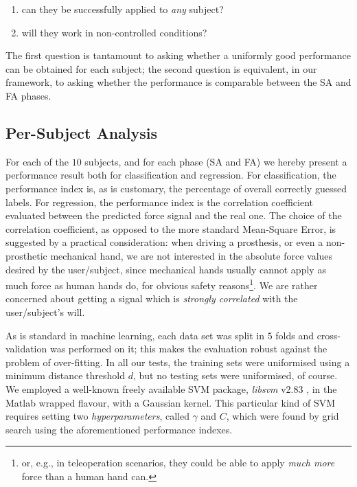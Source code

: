 \documentclass[10pt]{bmc_article}
\newenvironment{bmcformat}{\begin{raggedright}\baselineskip20pt\sloppy\setboolean{publ}{false}}{\end{raggedright}\baselineskip20pt\sloppy}
\begin{document}
\begin{bmcformat}
\begin{enumerate}

  \item can they be successfully applied to \emph{any} subject?

  \item will they work in non-controlled conditions?

\end{enumerate}

The first question is tantamount to asking whether a uniformly good
performance can be obtained for each subject; the second question is
equivalent, in our framework, to asking whether the performance is
comparable between the SA and FA phases.

\subsection*{Per-Subject Analysis}

For each of the $10$ subjects, and for each phase (SA and FA) we
hereby present a performance result both for classification and
regression. For classification, the performance index is, as is
customary, the percentage of overall correctly guessed labels. For
regression, the performance index is the correlation coefficient
evaluated between the predicted force signal and the real one. The
choice of the correlation coefficient, as opposed to the more standard
Mean-Square Error, is suggested by a practical consideration: when
driving a prosthesis, or even a non-prosthetic mechanical hand, we are
not interested in the absolute force values desired by the
user/subject, since mechanical hands usually cannot apply as much
force as human hands do, for obvious safety reasons\footnote{or, e.g.,
in teleoperation scenarios, they could be able to apply \emph{much
more} force than a human hand can.}. We are rather concerned about
getting a signal which is \emph{strongly correlated} with the
user/subject's will.

As is standard in machine learning, each data set was split in $5$
folds and cross-validation was performed on it; this makes the
evaluation robust against the problem of over-fitting. In all our
tests, the training sets were uniformised using a minimum distance
threshold $d$, but no testing sets were uniformised, of course. We
employed a well-known freely available SVM package, \emph{libsvm}
v2.83 \cite{ChangL01}, in the Matlab wrapped flavour, with a Gaussian
kernel. This particular kind of SVM requires setting two
\emph{hyperparameters}, called $\gamma$ and $C$, which were found by
grid search using the aforementioned performance indexes.


\end{bmcformat}
\end{document}
